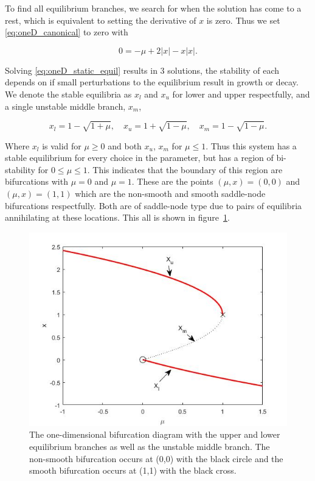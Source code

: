 To find all equilibrium branches, we search for when the solution has come to a rest, which is equivalent to setting the derivative of $x$ is zero. Thus we set \eqref{eq:oneD_canonical} to zero with

\begin{equation}\label{eq:oneD_static_equil}
0=-\mu +2|x|-x|x|.
\end{equation}

Solving \eqref{eq:oneD_static_equil} results in 3 solutions, the stability of each depends on if small perturbations to the equilibrium result in growth or decay. We denote the stable equilibria as $x_l$ and $x_u$ for lower and upper respectfully, and a single unstable middle branch, $x_{m}$,

\begin{equation*}
x_l=1-\sqrt{1+\mu},\quad x_u=1+\sqrt{1-\mu},\quad
x_{m}=1-\sqrt{1-\mu}.
\end{equation*}

Where $x_l$ is valid for $\mu\ge 0$ and both $x_u$, $x_{m}$ for $\mu\le 1$. Thus this system has a stable equilibrium for every choice in the parameter, but has a region of bi-stability for $0\le \mu\le 1$. This indicates that the boundary of this region are bifurcations with $\mu=0$ and $\mu=1$. These are the points ${(\mu,x)=(0,0)}$ and $(\mu,x)=(1,1)$ which are the non-smooth and smooth saddle-node bifurcations respectfully. Both are of saddle-node type due to pairs of equilibria annihilating at these locations. This all is shown in figure~\ref{fig:oneD_static_bifdiagram}.

\begin{figure}[H]
\centering
\includegraphics[width=\textwidth]{oneD/bif_diagram.jpg}
\caption{The one-dimensional bifurcation diagram with the upper and lower equilibrium branches as well as the unstable middle branch. The non-smooth bifurcation occurs at (0,0) with the black circle and the smooth bifurcation occurs at (1,1) with the black cross. }
\label{fig:oneD_static_bifdiagram}
\end{figure}


